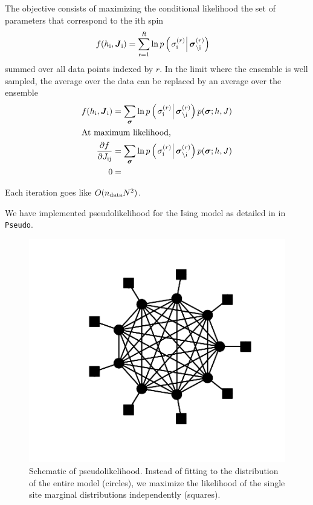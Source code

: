 \documentclass[aps,prl,twocolumn]{revtex4-1}
\begin{document}
The objective consists of maximizing the conditional likelihood the set of parameters that correspond to the ith spin
\begin{align}
	f(h_{\rm i},\boldsymbol{J}_{\rm i}) &= \sum_{\rm r=1}^R \ln p\left(\left.\sigma_{\rm i}^{(r)}\right|\boldsymbol{\sigma}_{\backslash\rm i}^{(r)}\right)
\end{align}
summed over all data points indexed by $r$.
In the limit where the ensemble is well sampled, the average over the data can be replaced by an average over the ensemble
\begin{align}
	f(h_{\rm i},\boldsymbol{J}_{\rm i}) &= \sum_{\boldsymbol{\sigma}} \ln p\left(\left.\sigma_{\rm i}^{(r)}\right|\boldsymbol{\sigma}_{\backslash\rm i}^{(r)}\right)p(\boldsymbol{\sigma};h,J)\\
\intertext{At maximum likelihood,}
	\frac{\partial f}{\partial J_{\rm ij}} &= \sum_{\boldsymbol{\sigma}} \ln p\left(\left.\sigma_{\rm i}^{(r)}\right|\boldsymbol{\sigma}_{\backslash\rm i}^{(r)}\right)p(\boldsymbol{\sigma};h,J)\\
	0 &=
\end{align}

Each iteration goes like $O(n_{\rm data}N^2)$.

We have implemented pseudolikelihood for the Ising model as detailed in \cite{Aurell:2012hi} in {\tt Pseudo}.

\begin{figure}[tb]\centering
	\includegraphics[width=.85\linewidth,clip,trim={100 50 30 30}]{images/pseudo}
\caption{Schematic of pseudolikelihood. Instead of fitting to the distribution of the entire model (circles), we maximize the likelihood of the single site marginal distributions independently (squares).}
\label{gr:pseudo}
\end{figure}
\end{document}
